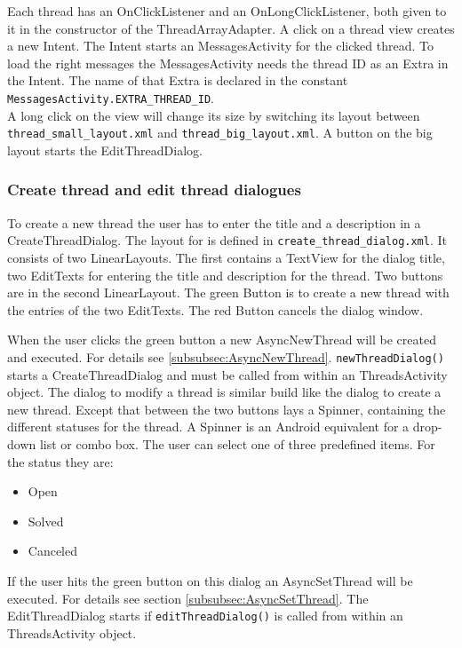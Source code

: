 \documentclass[12pt,a4paper,oneside]{report}
\newcommand{\code}[1]{\lstinline{#1}}
\begin{document}
Each thread has an OnClickListener and an OnLongClickListener, both given to it in the constructor of the ThreadArrayAdapter. A click on a thread view creates a new Intent.  The Intent starts an MessagesActivity for the clicked thread. To load the right messages the MessagesActivity needs the thread ID as an Extra in the Intent. The name of that Extra is declared in the constant \code{MessagesActivity.EXTRA_THREAD_ID}.\\


A long click on the view will change its size by switching its layout between \code{thread_small_layout.xml} and \code{thread_big_layout.xml}. A button on the big layout starts the EditThreadDialog.\\

\subsubsection{Create thread and edit thread dialogues}
To create a new thread the user has to enter the title and a description in a CreateThreadDialog. The layout for is defined in \code{create_thread_dialog.xml}. It consists of two LinearLayouts. The first contains a TextView for the dialog title, two EditTexts for entering the title and description for the thread. Two buttons are in the second LinearLayout. The green Button is to create a new thread with the entries of the two EditTexts. The red Button cancels the dialog window.

When the user clicks the green button a new AsyncNewThread will be created and executed. For details see \ref{subsubsec:AsyncNewThread}. \code{newThreadDialog()} starts a CreateThreadDialog and must be called from within an ThreadsActivity object.
The dialog to modify a thread is similar build like the dialog to create a new thread. Except that between the two buttons lays a Spinner, containing the different statuses for the thread. A Spinner is an Android equivalent for a drop-down list or combo box. The user can select one of three predefined items. For the status they are:
\begin{itemize}
\item Open
\item Solved
\item Canceled
\end{itemize}


If the user hits the green button on this dialog an AsyncSetThread will be executed. For details see section \ref{subsubsec:AsyncSetThread}. The EditThreadDialog starts if \code{editThreadDialog()} is called from within an ThreadsActivity object.
\end{document}
